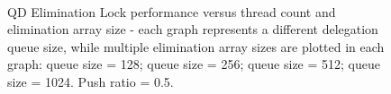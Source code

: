 \begin{figure}[]
\centering
{}
\\
\caption[]{QD Elimination Lock performance versus thread count and elimination array size - each graph represents a different delegation queue size, while multiple elimination array sizes are plotted in each graph:  queue size = 128;  queue size = 256;  queue size = 512;  queue size = 1024. Push ratio = 0.5.}
\label{fig:final}
\end{figure}

